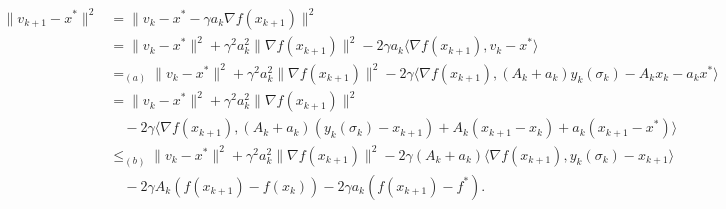 \documentclass[moor,sglanonrev]{informs4}
\begin{document}
\begin{align*}
    \|v_{k+1} - x^*\|^2
     & = \|v_k - x^* - \gamma a_k \nabla f(x_{k+1})\|^2                                                                                                             \\
     & = \|v_k - x^*\|^2 + \gamma^2 a_k^2 \|\nabla f(x_{k+1})\|^2
    - 2\gamma a_k \langle \nabla f(x_{k+1}), v_k - x^* \rangle                                                                                                      \\
     & =_{(a)} \|v_k - x^*\|^2 + \gamma^2 a_k^2 \|\nabla f(x_{k+1})\|^2  - 2\gamma \langle \nabla f(x_{k+1}), (A_k + a_k) y_k(\sigma_k) - A_k x_k - a_k x^* \rangle \\
     & = \|v_k - x^*\|^2 + \gamma^2 a_k^2 \|\nabla f(x_{k+1})\|^2                                                                                                   \\
     & \quad - 2\gamma \langle \nabla f(x_{k+1}),
    (A_k + a_k)(y_k(\sigma_k) - x_{k+1}) + A_k(x_{k+1} - x_k)
    + a_k(x_{k+1} - x^*) \rangle                                                                                                                                    \\
     & \leq_{(b)} \|v_k - x^*\|^2 + \gamma^2 a_k^2 \|\nabla f(x_{k+1})\|^2 - 2\gamma (A_k + a_k) \langle \nabla f(x_{k+1}), y_k(\sigma_k) - x_{k+1} \rangle         \\
     & \quad - 2\gamma A_k \left(f(x_{k+1}) - f(x_k)\right)
    - 2\gamma a_k \left(f(x_{k+1}) - f^*\right).
\end{align*}
\end{document}
